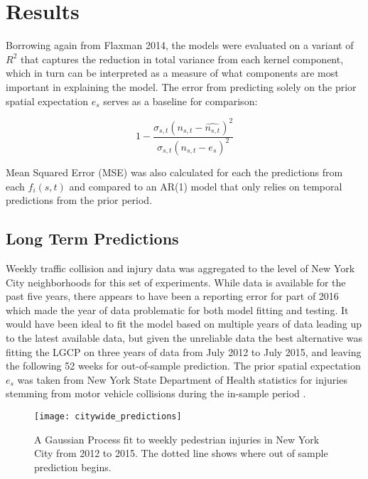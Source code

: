 \section{Results}
\label{results}

Borrowing again from Flaxman 2014, the models were evaluated on a variant of $R^2$ that captures the reduction in total variance from each kernel component, which in turn can be interpreted as a measure of what components are most important in explaining the model. The error from predicting solely on the prior spatial expectation $e_s$ serves as a baseline for comparison:

$$ 1 - \frac{\sigma_{s,t}(n_{s,t}- \hat{n_{s,t}})^2}{\sigma_{s,t}(n_{s,t} - e_{s})^2}$$

Mean Squared Error (MSE) was also calculated for each the predictions from each $f_i(s,t)$ and compared to an AR(1) model that only relies on temporal predictions from the prior period.


\subsection{Long Term Predictions}

 Weekly traffic collision and injury data was aggregated to the level of New York City neighborhoods for this set of experiments. While data is available for the past five years, there appears to have been a reporting error for part of 2016 which made the year of data problematic for both model fitting and testing. It would have been ideal to fit the model based on multiple years of data leading up to the latest available data, but given the unreliable data the best alternative was fitting the LGCP on three years of data from July 2012 to July 2015, and leaving the following 52 weeks for out-of-sample prediction. The prior spatial expectation $e_s$ was taken from New York State Department of Health statistics for injuries stemming from motor vehicle collisions during the in-sample period \cite{nys_crash_stats}. \par



 \begin{figure}[h!]
   \caption{A Gaussian Process fit to weekly pedestrian injuries in New York City from 2012 to 2015. The dotted line shows where out of sample prediction begins.}
   \texttt{[image: citywide\_predictions]}
 \end{figure}

